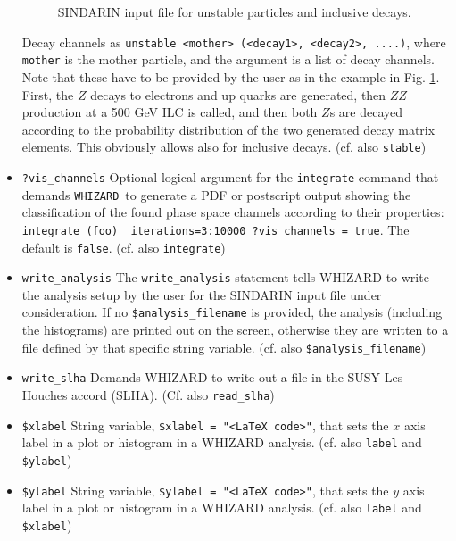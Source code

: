 \documentclass[12pt]{book}
\newcommand{\ttt}[1]{\texttt{#1}}
\newcommand{\whizard}{\texttt{WHIZARD}}
\begin{document}
\begin{itemize}
\begin{figure}
  \caption{\label{fig:ex_unstable} SINDARIN input file for unstable
    particles and inclusive decays.}
\end{figure}
Decay channels as \ttt{unstable <mother> (<decay1>, <decay2>, ....)},
where \ttt{mother} is the mother particle, and the argument is a list
of decay channels. Note that these have to be provided by the user as
in the example in Fig. \ref{fig:ex_unstable}. First, the $Z$ decays to
electrons and up quarks are generated, then $ZZ$ production at a 500
GeV ILC is called, and then both $Z$s are decayed according to the
probability distribution of the two generated decay matrix
elements. This obviously allows also for inclusive decays. 
(cf. also \ttt{stable})
\item
\ttt{?vis\_channels} \newline
Optional logical argument for the \ttt{integrate} command that demands
\whizard\ to generate a PDF or postscript output showing the
classification of the found phase space channels according to their
properties: \ttt{integrate (foo) { iterations=3:10000
    ?vis\_channels = true}}. The default is \ttt{false}.
(cf. also \ttt{integrate})
\item
\ttt{write\_analysis} \newline
The \ttt{write\_analysis} statement tells WHIZARD to write the
analysis setup by the user for the SINDARIN input file under
consideration. If no \ttt{\$analysis\_filename} is provided, the
analysis (including the histograms) are printed out on the screen,
otherwise they are written to a file defined by that specific string
variable. 
(cf. also \ttt{\$analysis\_filename})
\item
\ttt{write\_slha} \newline
Demands WHIZARD to write out a file in the SUSY Les Houches accord
(SLHA). 
(Cf. also \ttt{read\_slha})
\item
\ttt{\$xlabel} \newline
String variable, \ttt{\$xlabel = "<LaTeX code>"}, that sets the $x$
axis label in a plot or histogram in a WHIZARD analysis. 
(cf. also \ttt{label} and \ttt{\$ylabel})
\item
\ttt{\$ylabel} \newline
String variable, \ttt{\$ylabel = "<LaTeX code>"}, that sets the $y$
axis label in a plot or histogram in a WHIZARD analysis. 
(cf. also \ttt{label} and \ttt{\$xlabel})
\end{itemize}

\end{document}
